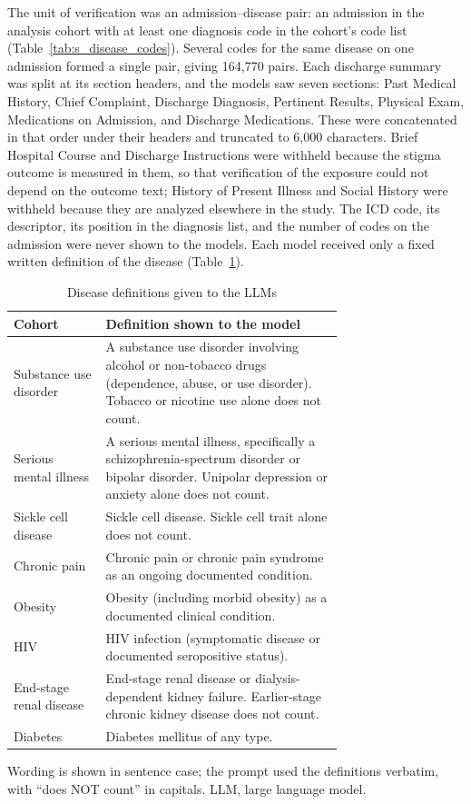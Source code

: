 \documentclass[unnumsec,webpdf,contemporary,large]{oup-authoring-template}
\begin{document}
The unit of verification was an admission--disease pair: an admission in the analysis cohort with at least one diagnosis code in the cohort's code list (Table~\ref{tab:s_disease_codes}). Several codes for the same disease on one admission formed a single pair, giving 164,770 pairs. Each discharge summary was split at its section headers, and the models saw seven sections: Past Medical History, Chief Complaint, Discharge Diagnosis, Pertinent Results, Physical Exam, Medications on Admission, and Discharge Medications. These were concatenated in that order under their headers and truncated to 6,000 characters. Brief Hospital Course and Discharge Instructions were withheld because the stigma outcome is measured in them, so that verification of the exposure could not depend on the outcome text; History of Present Illness and Social History were withheld because they are analyzed elsewhere in the study. The ICD code, its descriptor, its position in the diagnosis list, and the number of codes on the admission were never shown to the models. Each model received only a fixed written definition of the disease (Table~\ref{tab:s_llm_definitions}).

\begin{table}[H]
\caption{Disease definitions given to the LLMs}
\label{tab:s_llm_definitions}
\centering
\small
\begin{tabular}{@{}l>{\raggedright\arraybackslash}p{0.72\linewidth}@{}}
\toprule
Cohort & Definition shown to the model \\
\midrule
Substance use disorder & A substance use disorder involving alcohol or non-tobacco drugs (dependence, abuse, or use disorder). Tobacco or nicotine use alone does not count. \\
Serious mental illness & A serious mental illness, specifically a schizophrenia-spectrum disorder or bipolar disorder. Unipolar depression or anxiety alone does not count. \\
Sickle cell disease & Sickle cell disease. Sickle cell trait alone does not count. \\
Chronic pain & Chronic pain or chronic pain syndrome as an ongoing documented condition. \\
Obesity & Obesity (including morbid obesity) as a documented clinical condition. \\
HIV & HIV infection (symptomatic disease or documented seropositive status). \\
End-stage renal disease & End-stage renal disease or dialysis-dependent kidney failure. Earlier-stage chronic kidney disease does not count. \\
Diabetes & Diabetes mellitus of any type. \\
\bottomrule
\end{tabular}
\begin{tablenotes}
\item Wording is shown in sentence case; the prompt used the definitions verbatim, with ``does NOT count'' in capitals. LLM, large language model.
\end{tablenotes}
\end{table}
\end{document}
